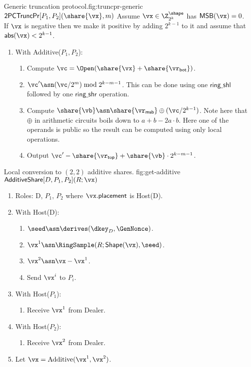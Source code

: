 \begin{Boxfig}{Generic truncation protocol.}{fig:truncpr-generic}
  {$\mathsf{2PCTruncPr}[P_1, P_2](\share{\vx}, m)$}
  Assume $\vx \in \Z_{2^k}^{\shape}$ has $\mathsf{MSB}(\vx) = 0$. If $\vx$ is negative then
  we make it positive by adding $2^{k-1}$ to it and assume that $\mathsf{abs}(\vx) < 2^{k-1}$.
  \begin{enumerate}
  \item With Additive($P_1,P_2$):
  \begin{enumerate}
    \item Compute $\vc = \Open(\share{\vx} + \share{\vr_{\mathsf{bot}}})$.
    \item $\vc' \asn (\vc/2^m) \bmod 2^{k-m-1}$. This can be done using one $\mathsf{ring\_shl}$
    followed by one $\mathsf{ring\_shr}$ operation.
    \item Compute $\share{\vb} \asn \share{\vr_{\mathsf{msb}}} \oplus (\vc / 2^{k-1})$. Note here that $\oplus$
    in arithmetic circuits boils down to $a + b - 2a\cdot b$. Here one of the operands is public so
    the result can be computed using only local operations.
    \item Output $\vc' - \share{\vr_{\mathsf{top}}} + \share{\vb} \cdot 2^{k-m-1}$.
 \end{enumerate}
\end{enumerate}

\end{Boxfig}


\begin{Boxfig}{Local conversion to $(2,2)$ additive shares.
  }{fig:get-additive}
  {$\mathsf{AdditiveShare}[D, P_1, P_2](R; \vx)$}
  \begin{enumerate}
    \item Roles: D, $P_1$, $P_2$ where $\vx.\mathsf{placement}$ is Host(D).
    \item With Host(D):
  \begin{enumerate}
    \item $\seed \asn \derives(\dkey_D, \GenNonce)$.
    \item $\vx^1 \asn \RingSample(R; \mathsf{Shape}(\vx), \seed)$.
    \item $\vx^2 \asn \vx - \vx^1$.
    \item Send $\vx^i$ to $P_i$.
  \end{enumerate}
  \item With Host($P_1$):
  \begin{enumerate}
      \item Receive $\vx^1$ from Dealer.
  \end{enumerate}
  \item With Host($P_2$):
  \begin{enumerate}
      \item Receive $\vx^2$ from Dealer.
  \end{enumerate}
  \item Let $\vx = \text{Additive}(\vx^1, \vx^2)$.
\end{enumerate}
\end{Boxfig}

